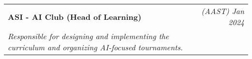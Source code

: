 \documentclass[letterpaper,10.5pt]{article}
\makeatletter
\newcommand{\resumeOrganizationHeading}[4]{
  \vspace{-2pt}\item
    \begin{tabular*}{0.97\textwidth}[t]{l@{\extracolsep{\fill}}r}
      \textbf{#1} & \textit{\small #2} \\
      \textit{\small#3}
    \end{tabular*}\vspace{-7pt}
}
\newcommand{\resumeSubHeadingListStart}{\begin{itemize}[leftmargin=0.15in, label={}]}
\newcommand{\resumeSubHeadingListEnd}{\end{itemize}}
\makeatother
\begin{document}
    \resumeOrganizationHeading
      {ASI - AI Club (Head of Learning)}{(AAST) Jan 2024}
      {Responsible for designing and implementing the curriculum and organizing AI-focused tournaments.}
    
  \resumeSubHeadingListEnd






\end{document}

